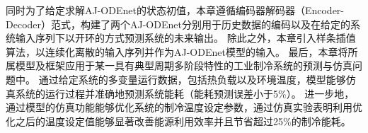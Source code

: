 
同时为了给定求解AJ-ODEnet的状态初值，本章遵循编码器解码器（Encoder-Decoder）范式，构建了两个AJ-ODEnet分别用于历史数据的编码以及在给定的系统输入序列下以开环的方式预测系统的未来输出。
除此之外，本章引入样条插值算法，以连续化离散的输入序列并作为AJ-ODEnet模型的输入。
最后，本章将所属模型及框架应用于某一具有典型周期多阶段特性的工业制冷系统的预测与仿真问题中。
通过给定系统的多变量运行数据，包括热负载以及环境温度，模型能够仿真系统的运行过程并准确地预测系统能耗（能耗预测误差小于5\%）。
进一步地，通过模型的仿真功能能够优化系统的制冷温度设定参数，通过仿真实验表明利用优化之后的温度设定值能够显著改善能源利用效率并且节省超过25\%的制冷能耗。






